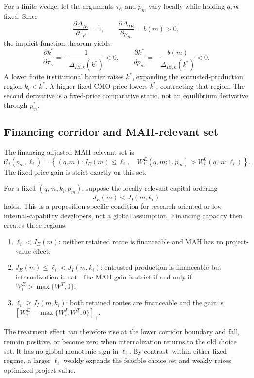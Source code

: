 For a finite wedge, let the arguments \(\tau_E\) and \(p_m\) vary locally
while holding \(q,m\) fixed. Since
\[
  \frac{\partial\Delta_{IE}}{\partial\tau_E}=1,
  \qquad
  \frac{\partial\Delta_{IE}}{\partial p_m}=b(m)>0,
\]
the implicit-function theorem yields
\begin{equation}
  \frac{\partial k^*}{\partial\tau_E}
  =
  -\frac{1}{\Delta_{IE,k}(k^*)}<0,
  \qquad
  \frac{\partial k^*}{\partial p_m}
  =
  -\frac{b(m)}{\Delta_{IE,k}(k^*)}<0.
  \label{eq:p04-cutoff-derivatives}
\end{equation}
A lower finite institutional barrier raises \(k^*\), expanding the
entrusted-production region \(k_i<k^*\). A higher fixed CMO price lowers
\(k^*\), contracting that region. The second derivative is a fixed-price
comparative static, not an equilibrium derivative through \(p_m^*\).

\subsection{Financing corridor and MAH-relevant set}
\label{subsec:p04-financing-corridor}

The financing-adjusted MAH-relevant set is
\begin{equation}
  \mathcal C_i(p_m,\ell_i)
  =
  \left\{(q,m):
  J_E(m)\leq\ell_i,\quad
  W_i^E(q,m;1,p_m)>W_i^0(q,m;\ell_i)
  \right\}.
  \label{eq:p04-finance-relevant-set}
\end{equation}
The fixed-price gain is strict exactly on this set.

For a fixed \((q,m,k_i,p_m)\), suppose the locally relevant capital ordering
\begin{equation}
  J_E(m)<J_I(m,k_i)
  \label{eq:p04-capital-ordering}
\end{equation}
holds. This is a proposition-specific condition for research-oriented or
low-internal-capability developers, not a global assumption. Financing
capacity then creates three regions:
\begin{enumerate}
  \item \(\ell_i<J_E(m)\): neither retained route is financeable and MAH has
  no project-value effect;
  \item \(J_E(m)\leq\ell_i<J_I(m,k_i)\): entrusted production is financeable
  but internalization is not. The MAH gain is strict if and only if
  \(W_i^E>\max\{W^T,0\}\);
  \item \(\ell_i\geq J_I(m,k_i)\): both retained routes are financeable and
  the gain is \([W_i^E-\max\{W_i^I,W^T,0\}]_+\).
\end{enumerate}
The treatment effect can therefore rise at the lower corridor boundary and
fall, remain positive, or become zero when internalization returns to the old
choice set. It has no global monotonic sign in \(\ell_i\). By contrast, within
either fixed regime, a larger \(\ell_i\) weakly expands the feasible choice
set and weakly raises optimized project value.

